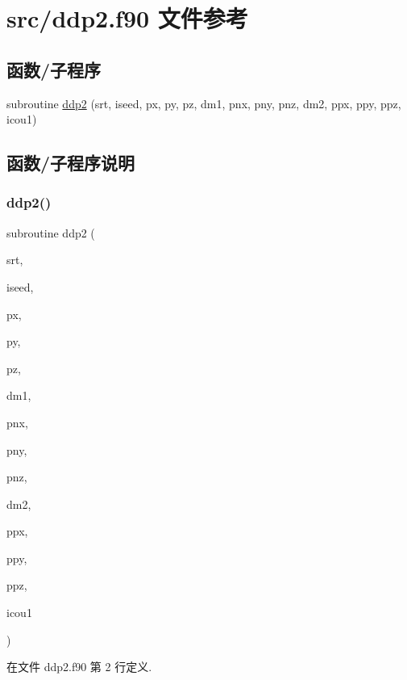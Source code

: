 \hypertarget{ddp2_8f90}{}\section{src/ddp2.f90 文件参考}
\label{ddp2_8f90}
\subsection*{函数/子程序}
\begin{DoxyCompactItemize}
\item 
subroutine \mbox{\hyperlink{ddp2_8f90_abb134740aef9d1048862edfa2719e930}{ddp2}} (srt, iseed, px, py, pz, dm1, pnx, pny, pnz, dm2, ppx, ppy, ppz, icou1)
\end{DoxyCompactItemize}


\subsection{函数/子程序说明}
\mbox{\label{ddp2_8f90_abb134740aef9d1048862edfa2719e930}} 
\subsubsection{\texorpdfstring{ddp2()}{ddp2()}}
{\footnotesize\ttfamily subroutine ddp2 (\begin{DoxyParamCaption}\item[{}]{srt,  }\item[{}]{iseed,  }\item[{}]{px,  }\item[{}]{py,  }\item[{}]{pz,  }\item[{}]{dm1,  }\item[{}]{pnx,  }\item[{}]{pny,  }\item[{}]{pnz,  }\item[{}]{dm2,  }\item[{}]{ppx,  }\item[{}]{ppy,  }\item[{}]{ppz,  }\item[{}]{icou1 }\end{DoxyParamCaption})}



在文件 ddp2.\+f90 第 2 行定义.

